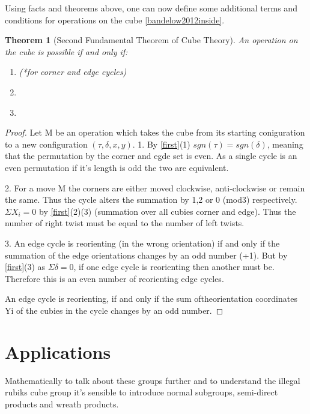 \documentclass{article}
\newtheorem{theorem}{Theorem}[section]
\begin{document}
Using facts and theorems above, one can now define some additional terms and conditions for operations on the cube \ref{bandelow2012inside}.
\begin{theorem}[Second Fundamental Theorem of Cube Theory]\label{second}
An operation on the cube is possible if and only if:
\begin{enumerate}
\item{ (*for corner and edge cycles)} 
\item{ }
\item{}
\end{enumerate}
\end{theorem}
\begin{proof}
Let M be an operation which takes the cube from its starting coniguration to a new configuration $(\tau,\delta, x, y)$.
1. By \ref{first}(1) $sgn(\tau) = sgn(\delta)$, meaning that the permutation by the corner and egde set is even. As a single cycle is an even permutation if it's length is odd the two are equivalent.

2. For a move M the corners are either moved clockwise, anti-clockwise or remain the same. Thus the cycle alters the summation by 1,2 or 0 (mod3) respectively.$\Sigma X_{i} = 0$ by \ref{first}(2)(3) (summation over all cubies corner and edge). Thus the number of right twist must be equal to the number of left twists.

3. An edge cycle is reorienting (in the wrong orientation) if and only if the summation of the edge orientations changes by an odd number (+1). But by \ref{first}(3) as $\Sigma \delta = 0$, if one edge cycle is reorienting then another must be. Therefore this is an even number of reorienting edge cycles.


An edge cycle is reorienting, if and only if the sum oftheorientation coordinates Yi of the cubies in the cycle changes by an odd number. 
\end{proof}

\newpage
\section{Applications}

Mathematically to talk about these groups further and to understand the illegal rubiks cube group it's sensible to introduce normal subgroups, semi-direct products and wreath products. 
\end{document}
